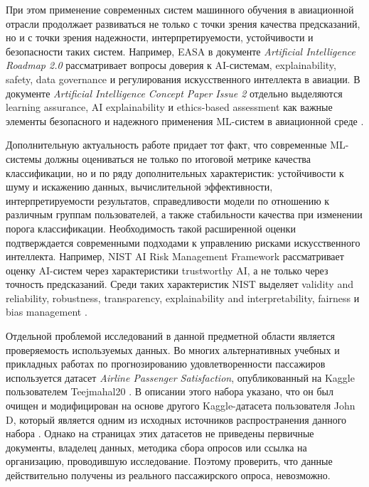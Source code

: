 \documentclass[14pt,a4paper]{extreport}
\begin{document}
При этом применение современных систем машинного обучения в авиационной отрасли продолжает развиваться не только с точки зрения качества предсказаний, но и с точки зрения надежности, интерпретируемости, устойчивости и безопасности таких систем. Например, EASA в документе \textit{Artificial Intelligence Roadmap 2.0} рассматривает вопросы доверия к AI-системам, explainability, safety, data governance и регулирования искусственного интеллекта в авиации. В документе \textit{Artificial\linebreak{} Intelligence Concept Paper Issue 2} отдельно выделяются learning assurance, AI\linebreak{} explainability и ethics-based assessment как важные элементы безопасного и надежного применения ML-систем в авиационной среде \cite{easa-roadmap,easa-concept}.

Дополнительную актуальность работе придает тот факт, что современные ML-системы должны оцениваться не только по итоговой метрике качества классификации, но и по ряду дополнительных характеристик: устойчивости к шуму и искажению данных, вычислительной эффективности, интерпретируемости результатов, справедливости модели по отношению к различным группам пользователей, а также стабильности качества при изменении порога классификации. Необходимость такой расширенной оценки подтверждается современными подходами к управлению рисками искусственного интеллекта. Например, NIST AI Risk Management Framework рассматривает оценку AI-систем через характеристики trustworthy AI, а не только через точность предсказаний. Среди таких характеристик NIST выделяет validity and reliability, robustness, transparency, explainability and interpretability, fairness и bias management \cite{nist-rmf,nist-characteristics}.

Отдельной проблемой исследований в данной предметной области является проверяемость используемых данных. Во многих альтернативных учебных и прикладных работах по прогнозированию удовлетворенности пассажиров используется датасет \textit{Airline Passenger Satisfaction}, опубликованный на Kaggle пользователем Teejmahal20 \cite{kaggle-old}. В описании этого набора указано, что он был очищен и модифицирован на основе другого Kaggle-датасета пользователя John D, который является одним из исходных источников распространения данного набора \cite{john-customer-satisfaction}. Однако на страницах этих датасетов не приведены первичные документы, владелец данных, методика сбора опросов или ссылка на организацию, проводившую исследование. Поэтому проверить, что данные действительно получены из реального пассажирского опроса, невозможно.
\end{document}

